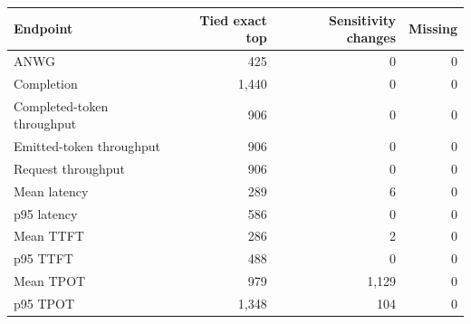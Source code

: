 \begin{tabular}{lrrr}\toprule
Endpoint & Tied exact top & Sensitivity changes & Missing \\ \midrule
ANWG & 425 & 0 & 0 \\
Completion & 1,440 & 0 & 0 \\
Completed-token throughput & 906 & 0 & 0 \\
Emitted-token throughput & 906 & 0 & 0 \\
Request throughput & 906 & 0 & 0 \\
Mean latency & 289 & 6 & 0 \\
p95 latency & 586 & 0 & 0 \\
Mean TTFT & 286 & 2 & 0 \\
p95 TTFT & 488 & 0 & 0 \\
Mean TPOT & 979 & 1,129 & 0 \\
p95 TPOT & 1,348 & 104 & 0 \\
\bottomrule\end{tabular}
